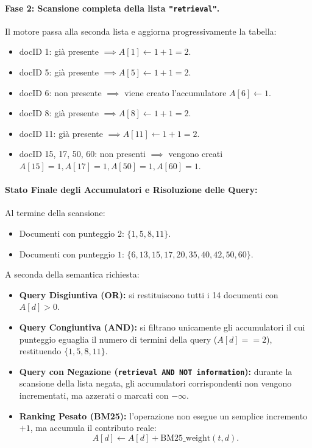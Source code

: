 \paragraph{Fase 2: Scansione completa della lista \texttt{"retrieval"}.}
Il motore passa alla seconda lista e aggiorna progressivamente la tabella:
\begin{itemize}
    \item docID 1: gi\`a presente $\implies A[1] \gets 1 + 1 = 2$.
    \item docID 5: gi\`a presente $\implies A[5] \gets 1 + 1 = 2$.
    \item docID 6: non presente $\implies$ viene creato l'accumulatore $A[6] \gets 1$.
    \item docID 8: gi\`a presente $\implies A[8] \gets 1 + 1 = 2$.
    \item docID 11: gi\`a presente $\implies A[11] \gets 1 + 1 = 2$.
    \item docID 15, 17, 50, 60: non presenti $\implies$ vengono creati $A[15]=1, A[17]=1, A[50]=1, A[60]=1$.
\end{itemize}

\paragraph{Stato Finale degli Accumulatori e Risoluzione delle Query:}
Al termine della scansione:
\begin{itemize}
    \item Documenti con punteggio $2$: $\{1, 5, 8, 11\}$.
    \item Documenti con punteggio $1$: $\{6, 13, 15, 17, 20, 35, 40, 42, 50, 60\}$.
\end{itemize}
A seconda della semantica richiesta:
\begin{itemize}
    \item \textbf{Query Disgiuntiva (OR):} si restituiscono tutti i 14 documenti con $A[d] > 0$.
    \item \textbf{Query Congiuntiva (AND):} si filtrano unicamente gli accumulatori il cui punteggio eguaglia il numero di termini della query ($A[d] == 2$), restituendo $\{1, 5, 8, 11\}$.
    \item \textbf{Query con Negazione (\texttt{retrieval AND NOT information}):} durante la scansione della lista negata, gli accumulatori corrispondenti non vengono incrementati, ma azzerati o marcati con $-\infty$.
    \item \textbf{Ranking Pesato (BM25):} l'operazione non esegue un semplice incremento $+1$, ma accumula il contributo reale:
    \begin{equation}
    A[d] \gets A[d] + \text{BM25\_weight}(t, d).
    \end{equation}
\end{itemize}

